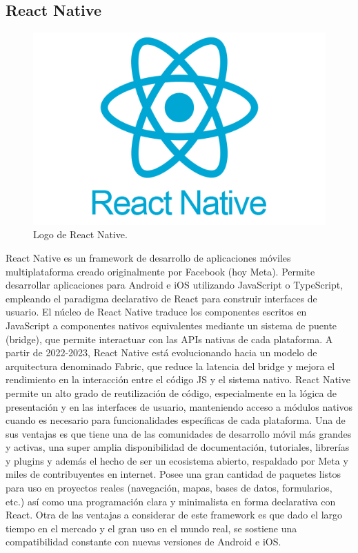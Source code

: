 \subsection{React Native}
\begin{figure}[h]
    \centering
    \includegraphics[scale=0.15]{Graphics/react_native_logo.png}
    \caption{Logo de React Native.}
    \label{fig:figura11}
\end{figure}
React Native es un framework de desarrollo de aplicaciones móviles multiplataforma creado originalmente por Facebook (hoy Meta). Permite desarrollar aplicaciones para Android e iOS utilizando JavaScript o TypeScript, empleando el paradigma declarativo de React para construir interfaces de usuario.
El núcleo de React Native traduce los componentes escritos en JavaScript a componentes nativos equivalentes mediante un sistema de puente (bridge), que permite interactuar con las APIs nativas de cada plataforma. A partir de 2022-2023, React Native está evolucionando hacia un modelo de arquitectura denominado Fabric, que reduce la latencia del bridge y mejora el rendimiento en la interacción entre el código JS y el sistema nativo.
React Native permite un alto grado de reutilización de código, especialmente en la lógica de presentación y en las interfaces de usuario, manteniendo acceso a módulos nativos cuando es necesario para funcionalidades específicas de cada plataforma.
Una de sus ventajas es que tiene una de las comunidades de desarrollo móvil más grandes y activas, una super amplia disponibilidad de documentación, tutoriales, librerías y plugins y además el hecho de ser un ecosistema abierto, respaldado por Meta y miles de contribuyentes en internet.
Posee una gran cantidad de paquetes listos para uso en proyectos reales (navegación, mapas, bases de datos, formularios, etc.) así como una programación clara y minimalista en forma declarativa con React. Otra de las ventajas a considerar de este framework es que dado el largo tiempo en el mercado y el gran uso en el mundo real, se sostiene una compatibilidad constante con nuevas versiones de Android e iOS.\\\\
